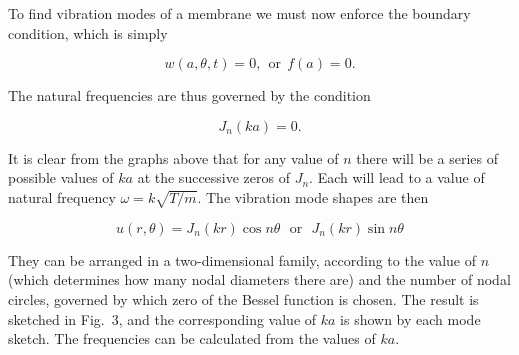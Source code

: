 
  To find vibration modes of a membrane we must now enforce the boundary 
  condition, which is simply 

  \begin{equation*}w(a,\theta,t) =0, \mathrm{~~or~~} f(a)=0 . 
  \tag{12}\end{equation*} 

  The natural frequencies are thus governed by the condition 

  \begin{equation*}J_n(ka)=0 . \tag{13}\end{equation*} 

  It is clear from the graphs above that for any value of $n$ there will be a 
  series of possible values of $ka$ at the successive zeros of $J_n$. Each will 
  lead to a value of natural frequency $\omega=k \sqrt{T/m}$. The vibration 
  mode shapes are then 

  \begin{equation*}u(r,\theta)=J_n(kr) \cos n \theta \mathrm{~~~or~~~}J_n(kr) 
  \sin n \theta \tag{14}\end{equation*} 

  They can be arranged in a two-dimensional family, according to the value of 
  $n$ (which determines how many nodal diameters there are) and the number of 
  nodal circles, governed by which zero of the Bessel function is chosen. The 
  result is sketched in Fig.\ 3, and the corresponding value of $ka$ is shown 
  by each mode sketch. The frequencies can be calculated from the values of 
  $ka$. 

